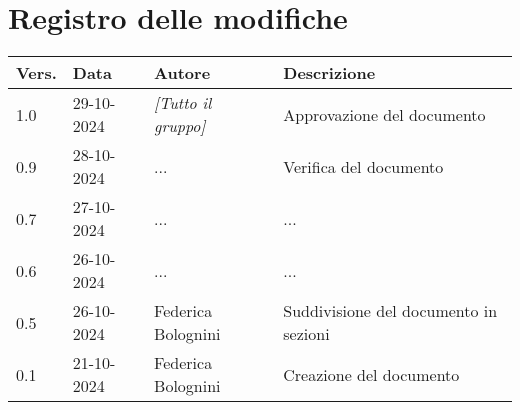 \section*{Registro delle modifiche}

\begin{table}[h]
    \centering
    \begin{tabular}{|l|l|l|p{5cm}|}
        \hline
        \rowcolor[gray]{0.9}
        \textbf{Vers.} & \textbf{Data} & \textbf{Autore} & \textbf{Descrizione}\\
        \hline
        1.0 & 29-10-2024 & \emph{[Tutto il gruppo]} & Approvazione del documento\\
        \hline
        0.9 & 28-10-2024 & ... & Verifica del documento\\
        \hline
        0.7 & 27-10-2024 & ... & ...\\
        \hline
        0.6 & 26-10-2024 & ... & ...\\
        \hline
        0.5 & 26-10-2024 & Federica Bolognini & Suddivisione del documento in sezioni\\
        \hline
        0.1 & 21-10-2024 & Federica Bolognini & Creazione del documento\\
        \hline
    \end{tabular}
\end{table}
